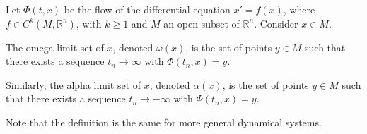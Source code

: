 \documentclass[12pt]{article}
\begin{document}
Let $\Phi(t,x)$ be the flow of the differential equation $x'=f(x)$, where $f\in C^k(M,\mathbb{R}^n)$, with $k\geq 1$ and $M$ an open subset of $\mathbb{R}^n$.
Consider $x\in M$. 

The omega limit set of $x$, denoted $\omega(x)$, is the set of points $y\in M$ such that there exists a sequence $t_n\to\infty$ with $\Phi(t_n,x)=y$.

Similarly, the alpha limit set of $x$, denoted $\alpha(x)$, is the set of points $y\in M$ such that there exists a sequence $t_n\to-\infty$ with $\Phi(t_n,x)=y$.

Note that the definition is the same for more general dynamical systems.
\end{document}
